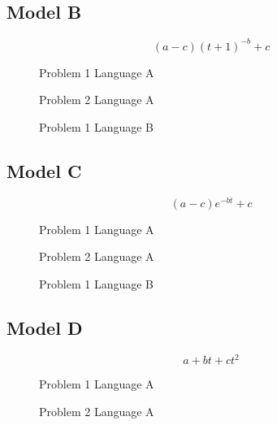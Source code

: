 \documentclass[a4paper,10pt]{article}
\begin{document}
\begin{appendices}
  \FloatBarrier
  \subsection{Model B}
  $$(a-c)(t+1)^{-b}+c$$
  
  \begin{figure}[!htb]
  \centering
  
  \caption{Problem 1 Language A}
  \end{figure}
  
  \begin{figure}[!htb]
  \centering
  
  \caption{Problem 2 Language A}
  \end{figure}
  
  \begin{figure}[!htb]
  \centering
  
  \caption{Problem 1 Language B}
  \end{figure}
  
  \FloatBarrier
  \clearpage
  \subsection{Model C}
  $$(a-c) e^{-bt} + c$$
  
  \begin{figure}[!htb]
  \centering
  
  \caption{Problem 1 Language A}
  \end{figure}
  
  \begin{figure}[!htb]
  \centering
  
  \caption{Problem 2 Language A}
  \end{figure}
  
  \begin{figure}[!htb]
  \centering
  
  \caption{Problem 1 Language B}
  \end{figure}
  
  \FloatBarrier
  \subsection{Model D}
  $$a+bt+ct^2$$
  
  \begin{figure}[!htb]
  \centering
  
  \caption{Problem 1 Language A}
  \end{figure}
  
  \begin{figure}[!htb]
  \centering
  
  \caption{Problem 2 Language A}
  \end{figure}
  

\end{appendices}
\end{document}
